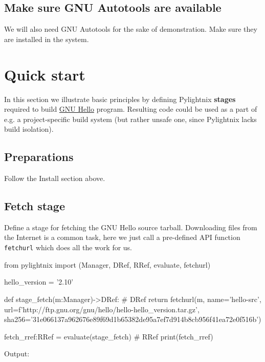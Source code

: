 \documentclass{article}
\begin{document}
\subsection{Make sure GNU Autotools are available}

We will also need GNU Autotools for the sake of demonstration. Make sure they
are installed in the system.

\section{Quick start}

In this section we illustrate basic principles by defining Pylightnix
\textbf{stages} required to build \href{https://www.gnu.org/software/hello/}{GNU
Hello} program. Resulting code could be used as a part of e.g. a
project-specific build system (but rather unsafe one, since Pylightnix lacks
build isolation).

\subsection{Preparations}

Follow the Install section above.

\subsection{Fetch stage}

Define a stage for fetching the GNU Hello source tarball. Downloading files
from the Internet is a common task, here we just call a pre-defined API
function \texttt{fetchurl} which does all the work for us.

\begin{pythontexcode}
from pylightnix import (Manager, DRef, RRef, evaluate, fetchurl)

hello_version = '2.10'

def stage_fetch(m:Manager)->DRef: # DRef \label{DREF}
  return fetchurl(m,
    name='hello-src',
    url=f'http://ftp.gnu.org/gnu/hello/hello-{hello_version}.tar.gz',
    sha256='31e066137a962676e89f69d1b65382de95a7ef7d914b8cb956f41ea72e0f516b')

fetch_rref:RRef = evaluate(stage_fetch)  # RRef \label{RREF}
print(fetch_rref)
\end{pythontexcode}

Output:

\mysmallstdout
\end{document}
